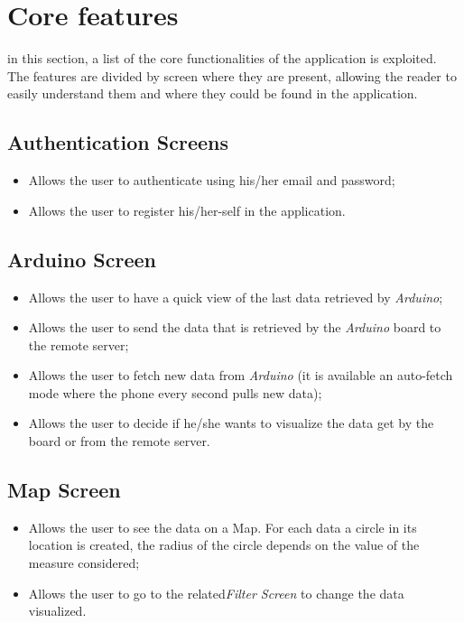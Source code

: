 \section{Core features}
in this section, a list of the core functionalities of the application is exploited. The features are divided by screen where they are present, allowing the reader to easily understand them and where they could be found in the application.

\subsection{Authentication Screens}
\begin{itemize}
    \item Allows the user to authenticate using his/her email and password;
    \item Allows the user to register his/her-self in the application.
\end{itemize}
    
\subsection{Arduino Screen}
\begin{itemize}
    \item Allows the user to have a quick view of the last data retrieved by \textit{Arduino};
    \item Allows the user to send the data that is retrieved by the \textit{Arduino} board to the remote server;
    \item Allows the user to fetch new data from \textit{Arduino} (it is available an auto-fetch mode where the phone every second pulls new data);
    \item Allows the user to decide if he/she wants to visualize the data get by the board or from the remote server.
\end{itemize}
    
\subsection{Map Screen}
\begin{itemize}
    \item Allows the user to see the data on a Map. For each data a circle in its location is created, the radius of the circle depends on the value of the measure considered;
    \item Allows the user to go to the related\textit{Filter Screen} to change the data visualized.
\end{itemize}
    
